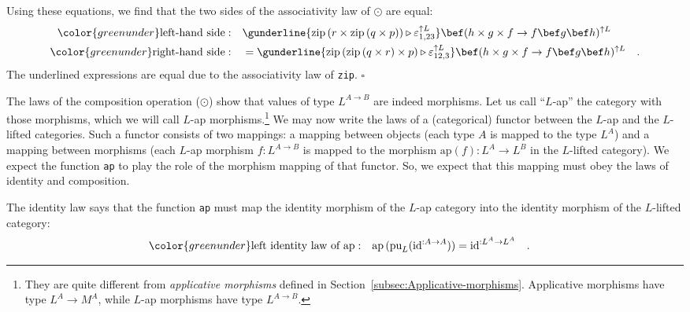 Using these equations, we find that the two sides of the associativity
law of $\odot$ are equal:
\begin{align*}
{\color{greenunder}\text{left-hand side}:}\quad & \gunderline{\text{zip}\left(r\times\text{zip}\left(q\times p\right)\right)\triangleright\varepsilon_{1,23}^{\uparrow L}}\bef(h\times g\times f\rightarrow f\bef g\bef h)^{\uparrow L}\\
{\color{greenunder}\text{right-hand side}:}\quad & =\gunderline{\text{zip}\left(\text{zip}\left(q\times r\right)\times p\right)\triangleright\varepsilon_{12,3}^{\uparrow L}}\bef(h\times g\times f\rightarrow f\bef g\bef h)^{\uparrow L}\quad.
\end{align*}
The underlined expressions are equal due to the associativity law
of \lstinline!zip!. $\square$

The laws of the composition operation ($\odot$) show that values
of type $L^{A\rightarrow B}$ are indeed morphisms. Let us call \textsf{``}$L$-ap\textsf{''}
the category with those morphisms, which we will call $L$-ap morphisms.\footnote{They are quite different from \emph{applicative morphisms} defined
in Section~\ref{subsec:Applicative-morphisms}. Applicative morphisms
have type $L^{A}\rightarrow M^{A}$, while $L$-ap morphisms have
type $L^{A\rightarrow B}$.} We may now write the laws of a (categorical) functor between the
$L$-ap and the $L$-lifted categories. Such a functor consists of
two mappings: a mapping between objects (each type $A$ is mapped
to the type $L^{A}$) and a mapping between morphisms (each $L$-ap
morphism $f:L^{A\rightarrow B}$ is mapped to the morphism $\text{ap}\left(f\right):L^{A}\rightarrow L^{B}$
in the $L$-lifted category). We expect the function \lstinline!ap!
to play the role of the morphism mapping of that functor. So, we expect
that this mapping must obey the laws of identity and composition.

The identity law says that the function \lstinline!ap! must map the
identity morphism of the $L$-ap category into the identity morphism
of the $L$-lifted category:
\begin{align}
{\color{greenunder}\text{left identity law of }\text{ap}:}\quad & \text{ap}\,(\text{pu}_{L}(\text{id}^{:A\rightarrow A}))=\text{id}^{:L^{A}\rightarrow L^{A}}\quad.\label{eq:identity-law-of-ap}
\end{align}

